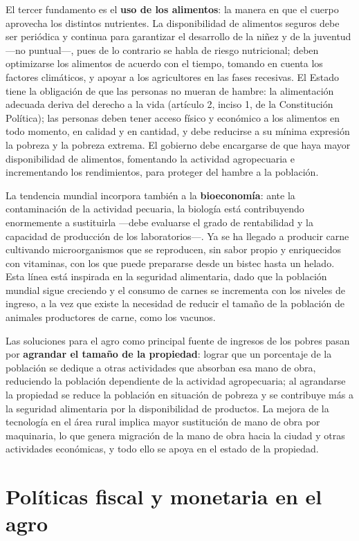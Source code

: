 \documentclass[
  man,
  floatsintext,
  longtable,
  a4paper,
  nolmodern,
  notxfonts,
  notimes,
  12pt,
  colorlinks=true,linkcolor=blue,citecolor=blue,urlcolor=blue]{apa7}
\begin{document}
El tercer fundamento es el \textbf{uso de los alimentos}: la manera en
que el cuerpo aprovecha los distintos nutrientes. La disponibilidad de
alimentos seguros debe ser periódica y continua para garantizar el
desarrollo de la niñez y de la juventud ---no puntual---, pues de lo
contrario se habla de riesgo nutricional; deben optimizarse los
alimentos de acuerdo con el tiempo, tomando en cuenta los factores
climáticos, y apoyar a los agricultores en las fases recesivas. El
Estado tiene la obligación de que las personas no mueran de hambre: la
alimentación adecuada deriva del derecho a la vida (artículo 2, inciso
1, de la Constitución Política); las personas deben tener acceso físico
y económico a los alimentos en todo momento, en calidad y en cantidad, y
debe reducirse a su mínima expresión la pobreza y la pobreza extrema. El
gobierno debe encargarse de que haya mayor disponibilidad de alimentos,
fomentando la actividad agropecuaria e incrementando los rendimientos,
para proteger del hambre a la población.

La tendencia mundial incorpora también a la \textbf{bioeconomía}: ante
la contaminación de la actividad pecuaria, la biología está
contribuyendo enormemente a sustituirla ---debe evaluarse el grado de
rentabilidad y la capacidad de producción de los laboratorios---. Ya se
ha llegado a producir carne cultivando microorganismos que se
reproducen, sin sabor propio y enriquecidos con vitaminas, con los que
puede prepararse desde un bistec hasta un helado. Esta línea está
inspirada en la seguridad alimentaria, dado que la población mundial
sigue creciendo y el consumo de carnes se incrementa con los niveles de
ingreso, a la vez que existe la necesidad de reducir el tamaño de la
población de animales productores de carne, como los vacunos.

Las soluciones para el agro como principal fuente de ingresos de los
pobres pasan por \textbf{agrandar el tamaño de la propiedad}: lograr que
un porcentaje de la población se dedique a otras actividades que
absorban esa mano de obra, reduciendo la población dependiente de la
actividad agropecuaria; al agrandarse la propiedad se reduce la
población en situación de pobreza y se contribuye más a la seguridad
alimentaria por la disponibilidad de productos. La mejora de la
tecnología en el área rural implica mayor sustitución de mano de obra
por maquinaria, lo que genera migración de la mano de obra hacia la
ciudad y otras actividades económicas, y todo ello se apoya en el estado
de la propiedad.

\section{Políticas fiscal y monetaria en el
agro}\label{poluxedticas-fiscal-y-monetaria-en-el-agro}
\end{document}
